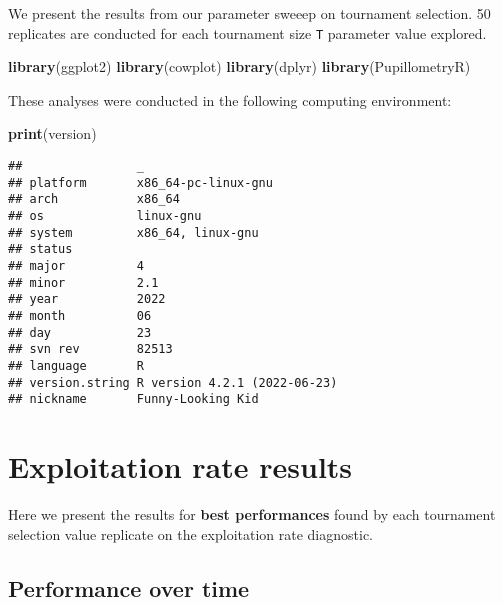 \documentclass[]{book}
\newenvironment{Shaded}{\begin{snugshade}}{\end{snugshade}}
\newcommand{\KeywordTok}[1]{\textcolor[rgb]{0.13,0.29,0.53}{\textbf{#1}}}
\newcommand{\NormalTok}[1]{#1}
\begin{document}
We present the results from our parameter sweeep on tournament selection.
50 replicates are conducted for each tournament size \texttt{T} parameter value explored.

\begin{Shaded}
\begin{Highlighting}[]
\KeywordTok{library}\NormalTok{(ggplot2)}
\KeywordTok{library}\NormalTok{(cowplot)}
\KeywordTok{library}\NormalTok{(dplyr)}
\KeywordTok{library}\NormalTok{(PupillometryR)}
\end{Highlighting}
\end{Shaded}

These analyses were conducted in the following computing environment:

\begin{Shaded}
\begin{Highlighting}[]
\KeywordTok{print}\NormalTok{(version)}
\end{Highlighting}
\end{Shaded}

\begin{verbatim}
##                _                           
## platform       x86_64-pc-linux-gnu         
## arch           x86_64                      
## os             linux-gnu                   
## system         x86_64, linux-gnu           
## status                                     
## major          4                           
## minor          2.1                         
## year           2022                        
## month          06                          
## day            23                          
## svn rev        82513                       
## language       R                           
## version.string R version 4.2.1 (2022-06-23)
## nickname       Funny-Looking Kid
\end{verbatim}

\hypertarget{exploitation-rate-results-2}{%
\section{Exploitation rate results}\label{exploitation-rate-results-2}}

Here we present the results for \textbf{best performances} found by each tournament selection value replicate on the exploitation rate diagnostic.

\hypertarget{performance-over-time-5}{%
\subsection{Performance over time}\label{performance-over-time-5}}
\end{document}
